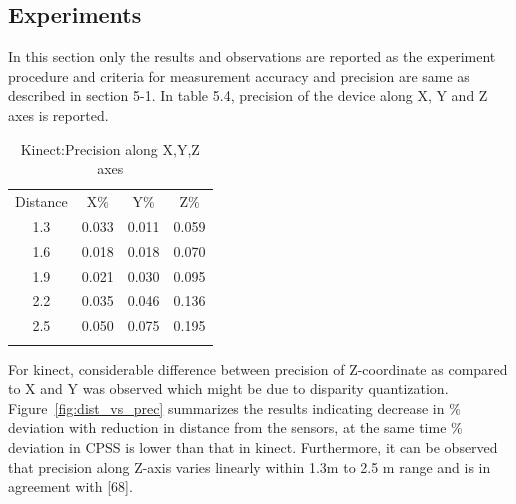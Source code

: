 \subsection{Experiments}
In this section only the results and observations are reported as the experiment procedure and criteria for measurement accuracy and precision are same as described in section 5-1. In table 5.4, precision of the device along X, Y and Z axes is reported.  
\begin{table}[ht]
\centering
\label{tab:2}       %
\begin{tabular}{c c c c}
\hline\noalign{\smallskip}
Distance & X\% & Y\% & Z\% \\
\noalign{\smallskip}\hline\noalign{\smallskip}
1.3 & 0.033 & 0.011 & 0.059 \\
1.6 & 0.018 & 0.018 & 0.070 \\
1.9 & 0.021 & 0.030 & 0.095 \\
2.2 & 0.035 & 0.046 & 0.136\\
2.5 & 0.050 & 0.075 & 0.195 \\
\noalign{\smallskip}\hline
\end{tabular}
\caption{Kinect:Precision along X,Y,Z axes}
\end{table}

\noindent
For kinect, considerable difference between precision of Z-coordinate as compared to X and Y was observed which might be due to disparity quantization. Figure~\ref{fig:dist_vs_prec} summarizes the results indicating decrease in \% deviation with reduction in distance from the sensors, at the same time \% deviation in CPSS is lower than that in kinect. Furthermore, it can be observed that precision along Z-axis varies linearly within 1.3m to 2.5 m range and is in agreement with [68].\newline


